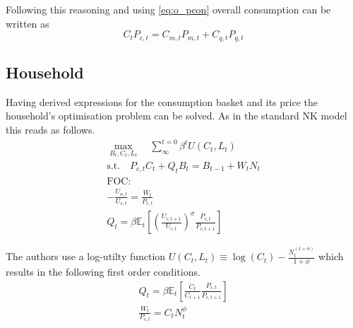\documentclass[12pt,a4paper,english]{article} %
\newcommand{\E}{\mathbb{E}} %
\begin{document}
	Following this reasoning and using \eqref{eq:o_pcon} overall consumption can be written as 
	\begin{equation}
		C_t P_{c,t} = C_{m,t}P_{m,t} + C_{q,t}P_{q,t}
	\end{equation}

	\subsection{Household}
	Having derived expressions for the consumption basket and its price the household's optimisation problem can be solved. As in the standard NK model this reads as follows. 
	\begin{equation}
		\begin{aligned}
			\max_{B_t, C_t, L_t} \quad \sum_{\infty}^{t=0} \beta^{t} U(C_{t}, L_{t}) \\
			\textrm{s.t.} \quad P_{c,t} C_t + Q_t B_t = B_{t-1} + W_t N_t \\
			\textrm{FOC:} \\
			- \frac{U_{n,t}}{U_{c, t}} = \frac{W_t}{P_{c,t}}\\
			Q_t = \beta \E_t \left[ \left( \frac{U_{c, t+1}}{U_{c,t}} \right)^\sigma \frac{P_{c,t}}{P_{c,t+1}} \right] 			
		\end{aligned}
	\end{equation}
	
	The authors use a log-utilty function $U(C_t,L_t) \equiv \log(C_t) - \frac{N_t^(1+\phi)}{1+\phi}$ which results in the following first order conditions.
	\begin{equation}
		\begin{aligned}
			Q_t = \beta \E_t \left[ \frac{C_t}{C_{t+1}} \frac{P_{c,t}}{P_{c,t+1}} \right] \\
			\frac{W_t}{P_{c,t}} = C_t N_t^\phi
		\end{aligned}
	\end{equation}
\end{document}
